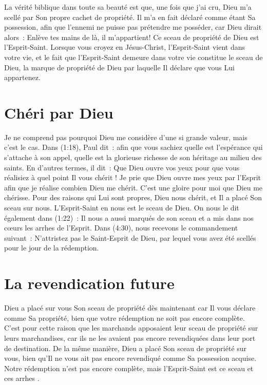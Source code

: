 La vérité biblique dans toute sa beauté est que, une fois que j'ai cru,
 Dieu m'a scellé par Son propre cachet de propriété.
 Il m'a en fait déclaré comme étant Sa possession, afin que l'ennemi
 ne puisse pas prétendre me posséder, car Dieu dirait alors~:
 \og  Enlève tes mains de là, il m'appartient! \fg{}
 Ce sceau de propriété de Dieu est l'Esprit-Saint.
 Lorsque vous croyez en Jésus-Christ, l'Esprit-Saint vient dans votre vie,
 et le fait que l'Esprit-Saint demeure dans votre vie
 constitue le sceau de Dieu, la marque de propriété de Dieu
 par laquelle Il déclare que vous Lui appartenez.


\section*{Chéri par Dieu}

Je ne comprend pas pourquoi Dieu me considère d'une si grande valeur,
 mais c'est le cas.
 Dans (1:18), Paul dit~:
 \og [\dots{}] afin que vous sachiez quelle est l'espérance
 qui s'attache à son appel, quelle est la glorieuse richesse
 de son héritage au milieu des saints. \fg{}
 En d'autres termes, il dit~:
 \og Que Dieu ouvre vos yeux pour que vous réalisiez
 à quel point Il vous chérit ! \fg{}
 Je prie que Dieu ouvre mes yeux par l'Esprit afin que je réalise
 combien Dieu me chérit. C'est une gloire pour moi que Dieu me chérisse.
 Pour des raisons qui Lui sont propres, Dieu nous chérit,
 et Il a placé Son sceau sur nous.
 L'Esprit-Saint en nous est le sceau de Dieu.
 On nous le dit également dans (1:22)~:
 \og Il nous a aussi marqués de son sceau et a mis dans nos cœurs
 les arrhes de l'Esprit. \fg{}
 Dans (4:30), nous recevons le commandement suivant~:
 \og N'attristez pas le Saint-Esprit de Dieu, par lequel
 vous avez été scellés pour le jour de la rédemption. \fg{}


\section*{La revendication future}

Dieu a placé sur vous Son sceau de propriété dès maintenant
 car Il vous déclare comme Sa propriété, bien que votre rédemption
 ne soit pas encore complète.
 C'est pour cette raison que les marchands apposaient leur sceau de propriété
 sur leurs marchandises, car ils ne les avaient pas encore revendiquées
 dans leur port de destination.
 De la même manière, Dieu a placé Son sceau de propriété sur vous,
 bien qu'Il ne vous ait pas encore revendiqué comme Sa possession acquise.
 Notre rédemption n'est pas encore complète,
 mais l'Esprit-Saint est ce sceau et \og ces arrhes \fg{}.

